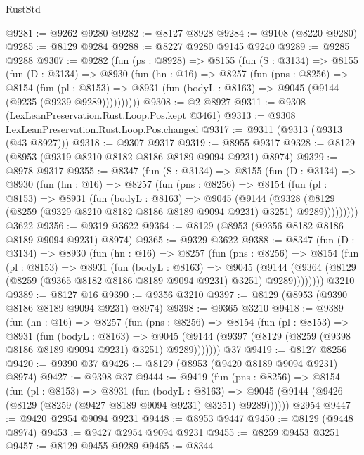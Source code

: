\begin{lexlean}{RustStd}
\begin{coremodule}
@9281 := @9262 @9280
@9282 := @8127 @8928
@9284 := @9108 (@8220 @9280)
@9285 := @8129 @9284
@9288 := @8227 @9280 @9145 @9240
@9289 := @9285 @9288
@9307 := @9282
    (fun (ps : @8928) =>
    @8155
      (fun (S : @3134) =>
      @8155
        (fun (D : @3134) =>
        @8930
          (fun (hn : @16) =>
          @8257
            (fun (pns : @8256) =>
            @8154
              (fun (pl : @8153) =>
              @8931 (fun (bodyL : @8163) => @9045 (@9144 (@9235 (@9239 @9289))))))))))
@9308 := @2 @8927
@9311 := @9308 (LexLeanPreservation.Rust.Loop.Pos.kept @3461)
@9313 := @9308 LexLeanPreservation.Rust.Loop.Pos.changed
@9317 := @9311 (@9313 (@9313 (@43 @8927)))
@9318 := @9307 @9317
@9319 := @8955 @9317
@9328 := @8129 (@8953 (@9319 @8210 @8182 @8186 @8189 @9094 @9231) @8974)
@9329 := @8978 @9317
@9355 := @8347
    (fun (S : @3134) =>
    @8155
      (fun (D : @3134) =>
      @8930
        (fun (hn : @16) =>
        @8257
          (fun (pns : @8256) =>
          @8154
            (fun (pl : @8153) =>
            @8931
              (fun (bodyL : @8163) =>
              @9045
                (@9144
                  (@9328
                    (@8129 (@8259 (@9329 @8210 @8182 @8186 @8189 @9094 @9231) @3251) @9289)))))))))
    @3622
@9356 := @9319 @3622
@9364 := @8129 (@8953 (@9356 @8182 @8186 @8189 @9094 @9231) @8974)
@9365 := @9329 @3622
@9388 := @8347
    (fun (D : @3134) =>
    @8930
      (fun (hn : @16) =>
      @8257
        (fun (pns : @8256) =>
        @8154
          (fun (pl : @8153) =>
          @8931
            (fun (bodyL : @8163) =>
            @9045
              (@9144 (@9364 (@8129 (@8259 (@9365 @8182 @8186 @8189 @9094 @9231) @3251) @9289))))))))
    @3210
@9389 := @8127 @16
@9390 := @9356 @3210
@9397 := @8129 (@8953 (@9390 @8186 @8189 @9094 @9231) @8974)
@9398 := @9365 @3210
@9418 := @9389
    (fun (hn : @16) =>
    @8257
      (fun (pns : @8256) =>
      @8154
        (fun (pl : @8153) =>
        @8931
          (fun (bodyL : @8163) =>
          @9045 (@9144 (@9397 (@8129 (@8259 (@9398 @8186 @8189 @9094 @9231) @3251) @9289)))))))
    @37
@9419 := @8127 @8256
@9420 := @9390 @37
@9426 := @8129 (@8953 (@9420 @8189 @9094 @9231) @8974)
@9427 := @9398 @37
@9444 := @9419
    (fun (pns : @8256) =>
    @8154
      (fun (pl : @8153) =>
      @8931
        (fun (bodyL : @8163) =>
        @9045 (@9144 (@9426 (@8129 (@8259 (@9427 @8189 @9094 @9231) @3251) @9289))))))
    @2954
@9447 := @9420 @2954 @9094 @9231
@9448 := @8953 @9447
@9450 := @8129 (@9448 @8974)
@9453 := @9427 @2954 @9094 @9231
@9455 := @8259 @9453 @3251
@9457 := @8129 @9455 @9289
@9465 := @8344

\end{coremodule}
\end{lexlean}
